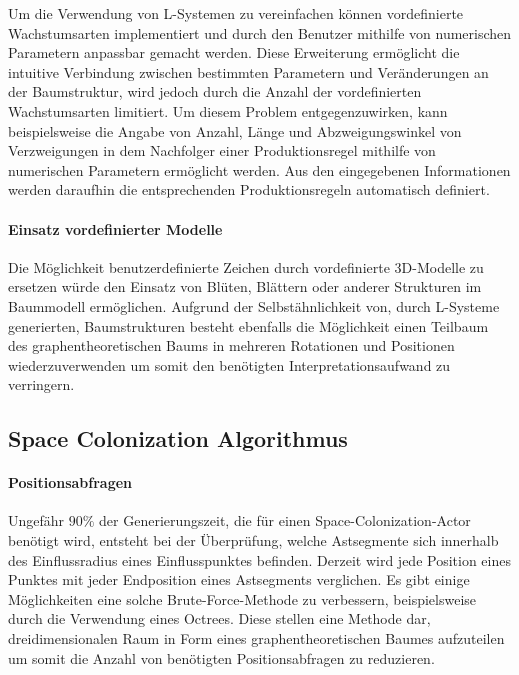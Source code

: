 Um die Verwendung von L-Systemen zu vereinfachen können vordefinierte Wachstumsarten implementiert und durch den Benutzer mithilfe von numerischen Parametern anpassbar gemacht werden. Diese Erweiterung ermöglicht die intuitive Verbindung zwischen bestimmten Parametern und Veränderungen an der Baumstruktur, wird jedoch durch die Anzahl der vordefinierten Wachstumsarten limitiert. Um diesem Problem entgegenzuwirken, kann beispielsweise die Angabe von Anzahl, Länge und Abzweigungswinkel von Verzweigungen in dem Nachfolger einer Produktionsregel mithilfe von numerischen Parametern ermöglicht werden. Aus den eingegebenen Informationen werden daraufhin die entsprechenden Produktionsregeln automatisch definiert.

\paragraph{Einsatz vordefinierter Modelle}

Die Möglichkeit benutzerdefinierte Zeichen durch vordefinierte 3D-Modelle zu ersetzen würde den Einsatz von Blüten, Blättern oder anderer Strukturen im Baummodell ermöglichen. Aufgrund der Selbstähnlichkeit von, durch L-Systeme generierten, Baumstrukturen besteht ebenfalls die Möglichkeit einen Teilbaum des graphentheoretischen Baums in mehreren Rotationen und Positionen wiederzuverwenden um somit den benötigten Interpretationsaufwand zu verringern. \cite[S.82]{Deussen:05}

\subsection{Space Colonization Algorithmus}

\paragraph{Positionsabfragen}

Ungefähr $90\%$ der Generierungszeit, die für einen Space-Colonization-Actor benötigt wird, entsteht bei der Überprüfung, welche Astsegmente sich innerhalb des Einflussradius eines Einflusspunktes befinden. Derzeit wird jede Position eines Punktes mit jeder Endposition eines Astsegments verglichen. Es gibt einige Möglichkeiten eine solche Brute-Force-Methode zu verbessern, beispielsweise durch die Verwendung eines Octrees. Diese stellen eine Methode dar, dreidimensionalen Raum in Form eines graphentheoretischen Baumes aufzuteilen um somit die Anzahl von benötigten Positionsabfragen zu reduzieren. \cite[S.1]{Octree:10}

